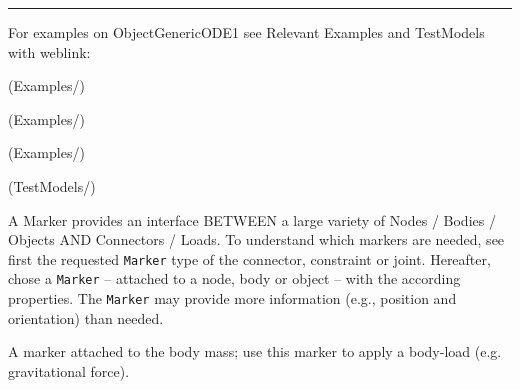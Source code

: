 \vspace{6pt}\par\noindent\rule{\textwidth}{0.4pt}
%
\noindent For examples on ObjectGenericODE1 see Relevant Examples and TestModels with weblink:
\bi
\item {} (Examples/)
\item {} (Examples/)
\item {} (Examples/)
\item {} (TestModels/)

\ei

%

\newpage
A Marker provides an interface BETWEEN a large variety of Nodes / Bodies / Objects AND Connectors / Loads. To understand which markers are needed, see first the requested \texttt{Marker} type of the connector, constraint or joint. Hereafter, chose a \texttt{Marker} -- attached to a node, body or object -- with the according properties. The \texttt{Marker} may provide more information (e.g., position and orientation) than needed.


\label{sec:item:MarkerBodyMass}
A marker attached to the body mass; use this marker to apply a body-load (e.g. gravitational force).
\vspace{12pt}\\

